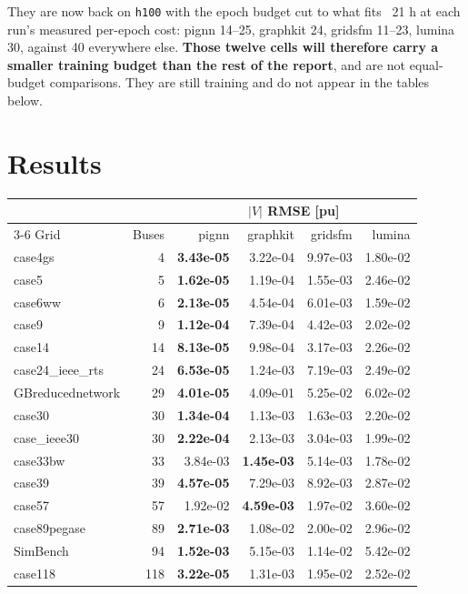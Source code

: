 \documentclass[10pt]{article}
\begin{document}
They are now back on \texttt{h100} with the epoch budget cut to what fits ~21 h
at each run's measured per-epoch cost: pignn 14--25, graphkit 24, gridsfm
11--23, lumina 30, against 40 everywhere else. \textbf{Those twelve cells will
therefore carry a smaller training budget than the rest of the report}, and are
not equal-budget comparisons. They are still training and do not appear in the
tables below.

\section{Results}

\begin{table}[H]
\centering\small
\begin{tabular}{lr rrrr}
\toprule
 & & \multicolumn{4}{c}{$|V|$ RMSE [pu]} \\
\cmidrule(lr){3-6}
Grid & Buses & pignn & graphkit & gridsfm & lumina \\
\midrule
case4gs & 4 & \textbf{3.43e-05} & 3.22e-04 & 9.97e-03 & 1.80e-02 \\
case5 & 5 & \textbf{1.62e-05} & 1.19e-04 & 1.55e-03 & 2.46e-02 \\
case6ww & 6 & \textbf{2.13e-05} & 4.54e-04 & 6.01e-03 & 1.59e-02 \\
case9 & 9 & \textbf{1.12e-04} & 7.39e-04 & 4.42e-03 & 2.02e-02 \\
case14 & 14 & \textbf{8.13e-05} & 9.98e-04 & 3.17e-03 & 2.26e-02 \\
case24\_ieee\_rts & 24 & \textbf{6.53e-05} & 1.24e-03 & 7.19e-03 & 2.49e-02 \\
GBreducednetwork & 29 & \textbf{4.01e-05} & 4.09e-01 & 5.25e-02 & 6.02e-02 \\
case30 & 30 & \textbf{1.34e-04} & 1.13e-03 & 1.63e-03 & 2.20e-02 \\
case\_ieee30 & 30 & \textbf{2.22e-04} & 2.13e-03 & 3.04e-03 & 1.99e-02 \\
case33bw & 33 & 3.84e-03 & \textbf{1.45e-03} & 5.14e-03 & 1.78e-02 \\
case39 & 39 & \textbf{4.57e-05} & 7.29e-03 & 8.92e-03 & 2.87e-02 \\
case57 & 57 & 1.92e-02 & \textbf{4.59e-03} & 1.97e-02 & 3.60e-02 \\
case89pegase & 89 & \textbf{2.71e-03} & 1.08e-02 & 2.00e-02 & 2.96e-02 \\
SimBench & 94 & \textbf{1.52e-03} & 5.15e-03 & 1.14e-02 & 5.42e-02 \\
case118 & 118 & \textbf{3.22e-05} & 1.31e-03 & 1.95e-02 & 2.52e-02 \\

\end{tabular}
\end{table}
\end{document}
